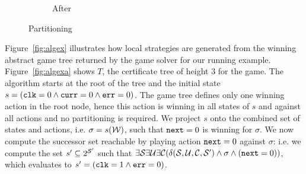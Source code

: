 \begin{figure}[b]
\begin{subfigure}[t]{.3\textwidth}
\begin{minipage}[t][3cm][t]{\textwidth}
        \end{minipage}
        \caption{After}
    \end{subfigure}%
    \hspace*{\fill}
    \caption{Partitioning}
    \label{fig:partition}
\end{figure}

Figure~\ref{fig:algex} illustrates how local strategies are generated from the winning abstract game tree returned by the game solver for our running example.  Figure~\ref{fig:algexa} shows $T$, the certificate tree of height 3 for the game. The algorithm starts at the root of the tree and the initial state $s = (\texttt{clk} = 0 \land \texttt{curr} = 0 \land \texttt{err} = 0)$.  The game tree defines only one winning action in the root node, hence this action is winning in all states of $s$ and against all actions and no partitioning is required. We project $s$ onto the combined set of states and actions, i.e. $\sigma = s(\mathcal{W})$, such that $\texttt{next} = 0$ is winning for $\sigma$. We now compute the successor set reachable by playing action $\texttt{next} = 0$ against $\sigma$: i.e. we compute the set $s' \subseteq 2^{\mathcal{S}'}$ such that $\exists \mathcal{S} \exists \mathcal{U} \exists \mathcal{C} (\delta(\mathcal{S}, \mathcal{U}, \mathcal{C}, \mathcal{S}') \land \sigma \land (\texttt{next} = 0))$, which evaluates to $s' = (\texttt{clk} = 1 \land \texttt{err} = 0)$.

